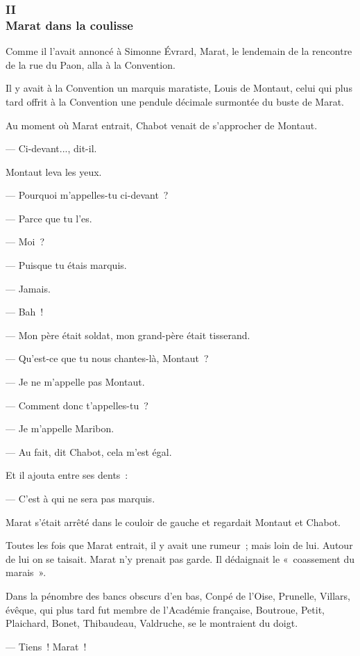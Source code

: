 \documentclass[french,twoside]{book} %
\begin{document}
 \subsubsection[{II. Marat dans la coulisse}]{II \\
Marat dans la coulisse}
\label{p2l3c2}
\noindent Comme il l’avait annoncé à Simonne Évrard, Marat, le lendemain de la rencontre de la rue du Paon, alla à la Convention.\par
Il y avait à la Convention un marquis maratiste, Louis de Montaut, celui qui plus tard offrit à la Convention une pendule décimale surmontée du buste de Marat.\par
Au moment où Marat entrait, Chabot venait de s’approcher de Montaut.\par
— Ci-devant..., dit-il.\par
Montaut leva les yeux.\par
— Pourquoi m’appelles-tu ci-devant ?\par
— Parce que tu l’es.\par
— Moi ?\par
— Puisque tu étais marquis.\par
— Jamais.\par
— Bah !\par
— Mon père était soldat, mon grand-père était tisserand.\par
— Qu’est-ce que tu nous chantes-là, Montaut ?\par
— Je ne m’appelle pas Montaut.\par
 — Comment donc t’appelles-tu ?\par
— Je m’appelle Maribon.\par
— Au fait, dit Chabot, cela m’est égal.\par
Et il ajouta entre ses dents :\par
— C’est à qui ne sera pas marquis.\par
Marat s’était arrêté dans le couloir de gauche et regardait Montaut et Chabot.\par
Toutes les fois que Marat entrait, il y avait une rumeur ; mais loin de lui. Autour de lui on se taisait. Marat n’y prenait pas garde. Il dédaignait le « coassement du marais ».\par
Dans la pénombre des bancs obscurs d’en bas, Conpé de l’Oise, Prunelle, Villars, évêque, qui plus tard fut membre de l’Académie française, Boutroue, Petit, Plaichard, Bonet, Thibaudeau, Valdruche, se le montraient du doigt.\par
— Tiens ! Marat !\par
\end{document}
